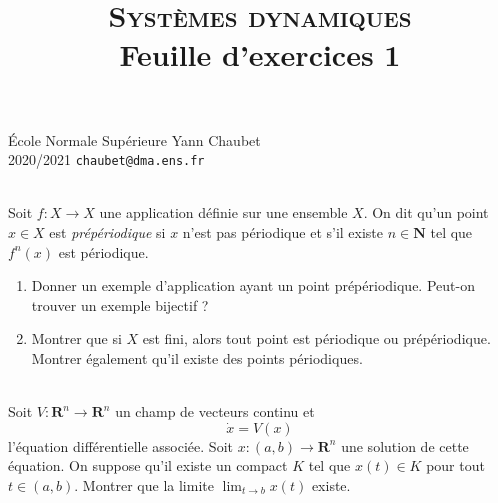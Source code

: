 \documentclass[a4paper,10pt,openany]{article}
\title{\textsc{Syst\`emes dynamiques} \\ Feuille d'exercices 1}
\date{}
\author{}
\theoremstyle{plain}
\theoremstyle{definition}
\newcommand{\R}{\mathbf{R}}
\newcommand{\N}{\mathbf{N}}
\begin{document}
{\noindent \'Ecole Normale Sup\'erieure  \hfill Yann Chaubet } \\
{2020/2021 \hfill \texttt{chaubet@dma.ens.fr}}

{\let\newpage\relax\maketitle}
\maketitle
{} \\ 

\noindent Soit $f : X \to X$ une application d\'efinie sur une ensemble $X$. On dit qu'un point $x \in X$ est \textit{pr\'ep\'eriodique} si $x$ n'est pas p\'eriodique et s'il existe $n \in \N$ tel que $f^n(x)$ est p\'eriodique.
{\begin{enumerate}
\item Donner un exemple d'application ayant un point pr\'ep\'eriodique. Peut-on trouver un exemple
bijectif ?
\item Montrer que si $X$ est fini, alors tout point est p\'eriodique ou pr\'ep\'eriodique. Montrer \'egalement qu'il existe des points p\'eriodiques.
\end{enumerate}
}
\hfill \break 

 \\ 

\noindent Soit $V : \R^n \to \R^n$ un champ de vecteurs continu et
$$
\dot{x} = V(x)
$$
l'\'equation diff\'erentielle associ\'ee. Soit $x : (a,b) \to \R^n$ une solution de cette \'equation. On suppose qu'il existe un compact $K$ tel que $x(t) \in K$ pour tout $t \in (a,b)$. Montrer que la limite $\lim_{t \to b} x(t)$ existe.
\hfill \break \\

 \\ 
\end{document}
